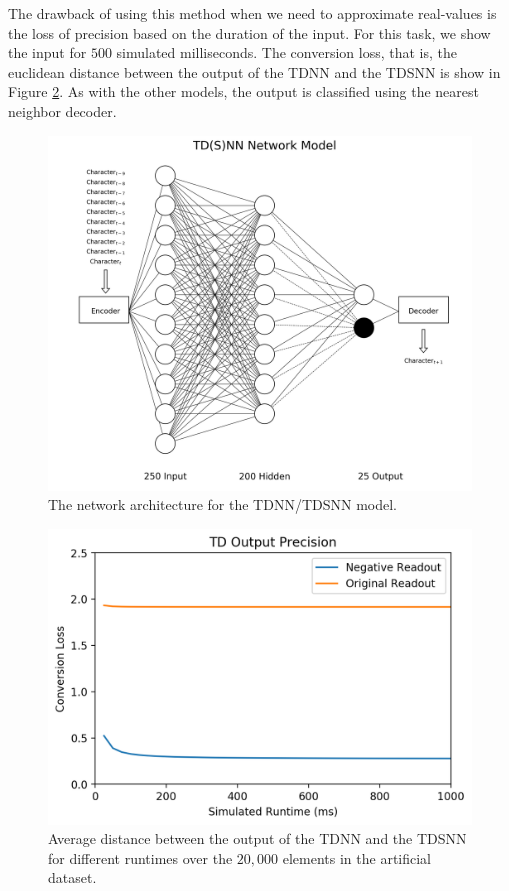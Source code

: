 \documentclass{article}
\begin{document}
The drawback of using this method when we need to approximate real-values is the loss of precision based on the duration of the input. For this task, we show the input for $500$ simulated milliseconds. The conversion loss, that is, the euclidean distance between the output of the TDNN and the TDSNN is show in Figure \ref{fig:clfig}. As with the other models, the output is classified using the nearest neighbor decoder.

\begin{figure}[H]
    \centering
    \includegraphics[width=0.9\linewidth]{../diagrams/tdnn.png}
    \caption{The network architecture for the TDNN/TDSNN model.}
    \label{fig:lstm-online-model}
\end{figure}

\begin{figure}[H]
    \centering
    \includegraphics[width=0.5\linewidth]{../results/conversion-loss.png}
    \caption{Average distance between the output of the TDNN and the TDSNN for different runtimes over the $20,000$ elements in the artificial dataset.}
    \label{fig:clfig}
\end{figure}
\end{document}
